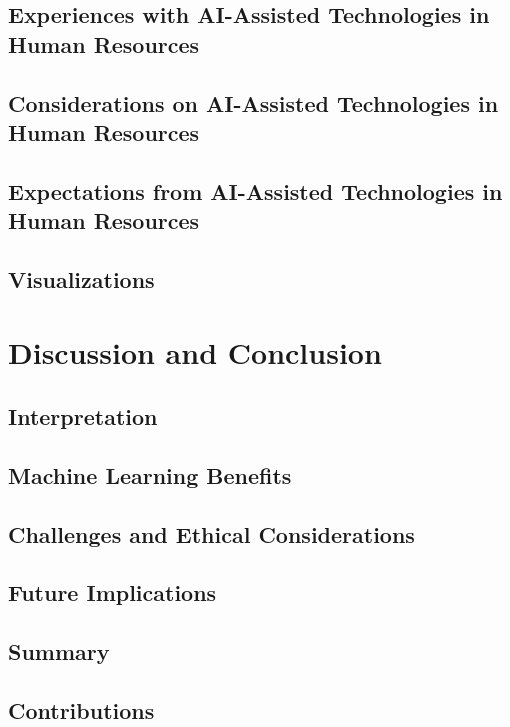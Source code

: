 \documentclass[draft,final]{thesisclass} %
\begin{document}
\section{Experiences with \acs{AI}-Assisted Technologies in Human Resources}
\lipsum[1]

\section{Considerations on \acs{AI}-Assisted Technologies in Human Resources}
\lipsum[1]

\section{Expectations from \acs{AI}-Assisted Technologies in Human Resources}
\lipsum[1]

\section{Visualizations}
\lipsum[1]

\chapter{Discussion and Conclusion} \label{discussion_and_conclusion}

\section{Interpretation}
\lipsum[1]

\section{Machine Learning Benefits}
\lipsum[1]

\section{Challenges and Ethical Considerations}
\lipsum[1]

\section{Future Implications}
\lipsum[1]

\section{Summary}
\lipsum[1]

\section{Contributions}
\lipsum[1]
\end{document}
